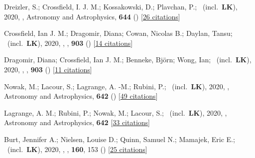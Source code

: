 \item[{\color{numcolor}\scriptsize46}] Dreizler, S.; Crossfield, I. J. M.; Kossakowski, D.; Plavchan, P.; \etal\ (incl.\ \textbf{LK}), 2020, , Astronomy and Astrophysics, \textbf{644} () [\href{https://ui.adsabs.harvard.edu/abs/2020A&A...644A.127D}{26 citations}]

\item[{\color{numcolor}\scriptsize45}] Crossfield, Ian J. M.; Dragomir, Diana; Cowan, Nicolas B.; Daylan, Tansu; \etal\ (incl.\ \textbf{LK}), 2020, , \apj, \textbf{903} () [\href{https://ui.adsabs.harvard.edu/abs/2020ApJ...903L...7C}{14 citations}]

\item[{\color{numcolor}\scriptsize44}] Dragomir, Diana; Crossfield, Ian J. M.; Benneke, Bj{\"o}rn; Wong, Ian; \etal\ (incl.\ \textbf{LK}), 2020, , \apj, \textbf{903} () [\href{https://ui.adsabs.harvard.edu/abs/2020ApJ...903L...6D}{11 citations}]

\item[{\color{numcolor}\scriptsize43}] Nowak, M.; Lacour, S.; Lagrange, A. -M.; Rubini, P.; \etal\ (incl.\ \textbf{LK}), 2020, , Astronomy and Astrophysics, \textbf{642} () [\href{https://ui.adsabs.harvard.edu/abs/2020A&A...642L...2N}{49 citations}]

\item[{\color{numcolor}\scriptsize42}] Lagrange, A. M.; Rubini, P.; Nowak, M.; Lacour, S.; \etal\ (incl.\ \textbf{LK}), 2020, , Astronomy and Astrophysics, \textbf{642} [\href{https://ui.adsabs.harvard.edu/abs/2020A&A...642A..18L}{33 citations}]

\item[{\color{numcolor}\scriptsize41}] Burt, Jennifer A.; Nielsen, Louise D.; Quinn, Samuel N.; Mamajek, Eric E.; \etal\ (incl.\ \textbf{LK}), 2020, , \aj, \textbf{160}, 153 () [\href{https://ui.adsabs.harvard.edu/abs/2020AJ....160..153B}{25 citations}]

